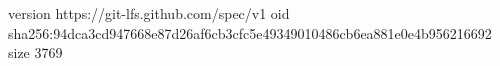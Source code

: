 version https://git-lfs.github.com/spec/v1
oid sha256:94dca3cd947668e87d26af6cb3cfc5e49349010486cb6ea881e0e4b956216692
size 3769
